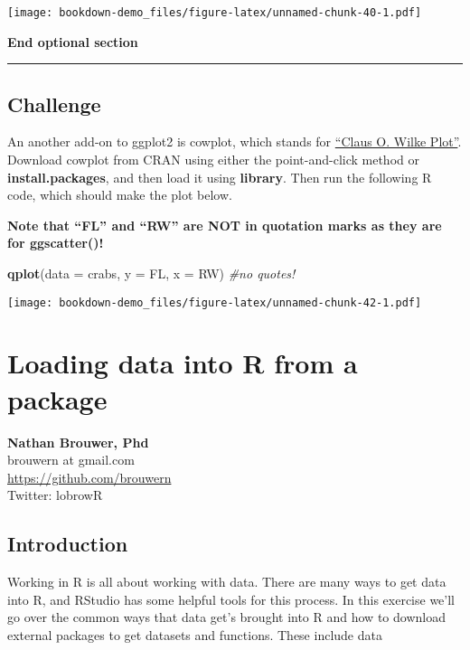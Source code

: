 \documentclass[]{book}
\newenvironment{Shaded}{\begin{snugshade}}{\end{snugshade}}
\newcommand{\KeywordTok}[1]{\textcolor[rgb]{0.13,0.29,0.53}{\textbf{#1}}}
\newcommand{\DataTypeTok}[1]{\textcolor[rgb]{0.13,0.29,0.53}{#1}}
\newcommand{\CommentTok}[1]{\textcolor[rgb]{0.56,0.35,0.01}{\textit{#1}}}
\newcommand{\NormalTok}[1]{#1}
\theoremstyle{definition}
\theoremstyle{definition}
\theoremstyle{definition}
\theoremstyle{remark}
\begin{document}
\texttt{[image: bookdown-demo\_files/figure-latex/unnamed-chunk-40-1.pdf]}

\textbf{End optional section}

\begin{center}\rule{0.5\linewidth}{\linethickness}\end{center}

\section{Challenge}\label{challenge}

An another add-on to ggplot2 is cowplot, which stands for
\href{https://cran.r-project.org/web/packages/cowplot/vignettes/introduction.html}{``Claus
O. Wilke Plot''}. Download cowplot from CRAN using either the
point-and-click method or \textbf{install.packages}, and then load it
using \textbf{library}. Then run the following R code, which should make
the plot below.

\textbf{Note that ``FL'' and ``RW'' are NOT in quotation marks as they
are for ggscatter()!}

\begin{Shaded}
\begin{Highlighting}[]
\KeywordTok{qplot}\NormalTok{(}\DataTypeTok{data =}\NormalTok{ crabs, }\DataTypeTok{y =}\NormalTok{ FL, }\DataTypeTok{x =}\NormalTok{ RW) }\CommentTok{#no quotes!}
\end{Highlighting}
\end{Shaded}

\texttt{[image: bookdown-demo\_files/figure-latex/unnamed-chunk-42-1.pdf]}

\chapter{Loading data into R from a
package}\label{loading-data-into-r-from-a-package}

\textbf{Nathan Brouwer, Phd}\\
brouwern at gmail.com\\
\url{https://github.com/brouwern}\\
Twitter: lobrowR

\section{Introduction}\label{introduction-1}

Working in R is all about working with data. There are many ways to get
data into R, and RStudio has some helpful tools for this process. In
this exercise we'll go over the common ways that data get's brought into
R and how to download external packages to get datasets and functions.
These include data
\end{document}
